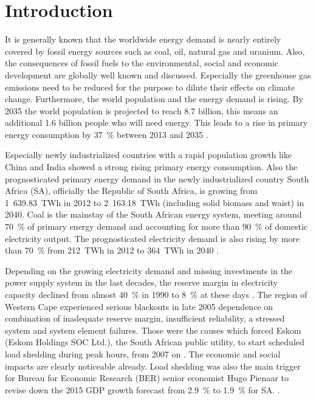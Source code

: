 \chapter{Introduction}
%
It is generally known that the worldwide energy demand is nearly entirely covered by fossil energy sources such as coal, oil, natural gas and uranium. Also, the consequences of fossil fuels to the environmental, social and economic development are globally well known and discussed. Especially the greenhouse gas emissions need to be reduced for the purpose to dilute their effects on climate change. Furthermore, the world population and the energy demand is rising. By 2035 the world population is projected to reach 8.7 billion, this means an additional 1.6 billion people who will need energy. This leads to a rise in primary energy consumption by 37~\% between 2013 and 2035 \cite{BP2015a}. 



Especially newly industrialized countries with a rapid population growth like China and India showed a strong rising primary energy consumption. Also the prognosticated primary energy demand in the newly industrialized country South Africa (SA), officially the Republic of South Africa, is growing from 1~639.83~TWh in 2012 to 2~163.18~TWh (including solid biomass and waist) in 2040. Coal is the mainstay of the South African energy system, meeting around 70~\% of primary energy demand and accounting for more than 90~\% of domestic electricity output. The prognosticated electricity demand is also rising by more than 70~\% from 212~TWh in 2012 to 364~TWh in 2040 \cite{IEA2014f}.



Depending on the growing electricity demand and missing investments in the power supply system in the last decades, the reserve margin in electricity capacity declined from almost 40~\% in 1990 to 8~\% at these days \cite{Trollip2014,Eskom2015}. The region of Western Cape experienced serious blackouts in late 2005 dependence on combination of inadequate reserve margin, insufficient reliability, a stressed system and system element failures. Those were the causes which forced Eskom (Eskom Holdings SOC Ltd.), the South African public utility, to start scheduled load shedding during peak hours, from 2007 on \cite{Trollip2014}. The economic and social impacts are clearly noticeable already. Load shedding was also the main trigger for Bureau for Economic Research (BER) senior economist Hugo Pienaar to revise down the 2015 GDP growth forecast from 2.9~\% to 1.9~\% for SA. \cite{Bisseker2015}.



